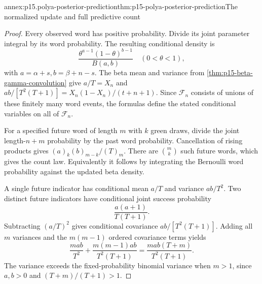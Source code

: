 \begin{annexitem}{annex:p15.polya-posterior-prediction}{thm:p15-polya-posterior-prediction}{The normalized update and full predictive count}
\begin{proof}
Every observed word has positive probability.
Divide its joint parameter integral by its word probability.
The resulting conditional density is
\[
       \frac{\theta^{a-1}(1-\theta)^{b-1}}{B(a,b)}
                         \quad(0<\theta<1),
\]
with \(a=\alpha+s,b=\beta+n-s\).
The beta mean and variance from
\cref{thm:p15-beta-gamma-convolution} give \(a/T=X_n\) and
\(ab/[T^2(T+1)]=X_n(1-X_n)/(t+n+1)\).
Since \(\mathcal F_n\) consists of unions of these finitely many word
events, the formulas define the stated conditional variables on all
of \(\mathcal F_n\).

For a specified future word of length \(m\) with \(k\) green draws,
divide the joint length-\(n+m\) probability by the past word probability.
Cancellation of rising products gives
\((a)_k(b)_{m-k}/(T)_m\).
There are \(\binom mk\) such future words, which gives the count law.
Equivalently it follows by integrating the Bernoulli word probability
against the updated beta density.

A single future indicator has conditional mean \(a/T\) and variance
\(ab/T^2\). Two distinct future indicators have conditional joint
success probability
\[
                        \frac{a(a+1)}{T(T+1)}.
\]
Subtracting \((a/T)^2\) gives conditional covariance
\(ab/[T^2(T+1)]\). Adding all \(m\) variances and the \(m(m-1)\)
ordered covariance terms yields
\[
 \frac{mab}{T^2}+\frac{m(m-1)ab}{T^2(T+1)}
       =\frac{mab(T+m)}{T^2(T+1)}.
\]
The variance exceeds the fixed-probability binomial variance when
\(m>1\), since \(a,b>0\) and \((T+m)/(T+1)>1\).
\end{proof}
\end{annexitem}

